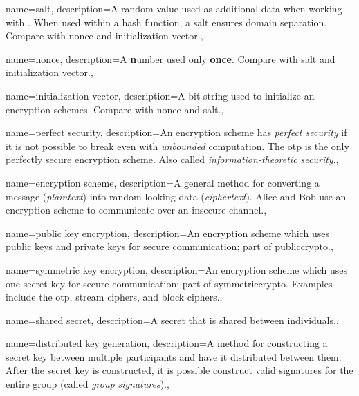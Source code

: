 
{
    name={salt},
    description={A random value used as additional data when working
        with .
        When used within a \gls{hash function}, a salt ensures
        domain separation.
        Compare with \gls{nonce} and \gls{initialization vector}.},
}

{
    name={nonce},
    description={A \textbf{n}umber used only \textbf{once}.
        Compare with \gls{salt} and \gls{initialization vector}.},
}

{
    name={initialization vector},
    description={A bit string used to initialize an
        \glspl{encryption scheme}.
        Compare with \gls{nonce} and \gls{salt}.},
}

{
    name={perfect security},
    description={An \gls{encryption scheme} has \emph{perfect security}
        if it is not possible
        to break even with \emph{unbounded} computation.
        The \gls{otp} is the only perfectly secure \gls{encryption scheme}.
        Also called \emph{information-theoretic security}.},
}

{
    name={encryption scheme},
    description={A general method for converting a message (\emph{plaintext})
        into random-looking data (\emph{ciphertext}).
        Alice and Bob use an encryption scheme to communicate
        over an \gls{insecure channel}.},
}

{
    name={public key encryption},
    description={An \gls{encryption scheme} which uses public keys
        and private keys for secure communication; part of \gls{publiccrypto}.},
}

{
    name={symmetric key encryption},
    description={An \gls{encryption scheme} which uses one secret key
        for secure communication; part of \gls{symmetriccrypto}.
        Examples include the \gls{otp}, \glspl{stream cipher},
        and \glspl{block cipher}.},
}

{
    name={shared secret},
    description={A secret that is shared between individuals.},
}

{
    name={distributed key generation},
    description={A method for constructing a secret key between multiple
        participants and have it distributed between them.
        After the secret key is constructed, it is possible construct
        valid \glspl{signature} for the entire group
        (called \emph{group signatures}).},
}

